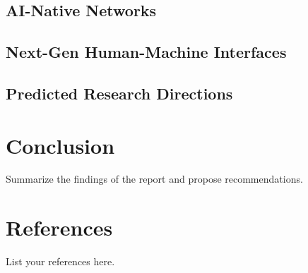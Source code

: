 \documentclass[12pt]{article}
\begin{document}
	\subsection{AI-Native Networks}
	\subsection{Next-Gen Human-Machine Interfaces}
	\subsection{Predicted Research Directions}
\newpage
\section{Conclusion}
Summarize the findings of the report and propose recommendations.

\newpage
\section*{References}
List your references here.
\end{document}
